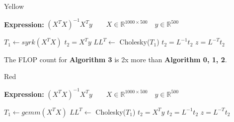 \documentclass[conference]{IEEEtran}
\begin{document}
\begin{algorithm}
	\renewcommand{\thealgorithm}{}
	\caption{ Yellow }
	\label{alg:a0}
	\textbf{Expression: } $(X^TX)^{-1}X^{T}y \qquad X \in \mathbb{R}^{1000 \times 500} \quad y \in \mathbb{R}^{500}$ 
	\begin{algorithmic}[1] 
		\State $T_1 \leftarrow syrk(X^{T}X)$ 
		\State $t_2 = X^{T}y$ 
		\State $LL^{T} \leftarrow $ Cholesky($T_1$) 
		\State $t_2 = L^{-1}t_2$ 
		\State $z = L^{-T}t_2$
	\end{algorithmic}
\end{algorithm}

The FLOP count for \textbf{Algorithm 3} is 2x more than  \textbf{Algorithm 0, 1, 2}.
\begin{algorithm}[H]
	\renewcommand{\thealgorithm}{}
	\caption{ Red }
	\label{alg:a0}
	\textbf{Expression: } $(X^TX)^{-1}X^{T}y \qquad X \in \mathbb{R}^{1000 \times 500} \quad y \in \mathbb{R}^{500}$ 
	\begin{algorithmic}[1] 
		\State $T_1 \leftarrow gemm(X^{T}X)$ 
		\State $LL^{T} \leftarrow $ Cholesky($T_1$) 
		\State $t_2 = X^{T}y$ 
		\State $t_2 = L^{-1}t_2$ 
		\State $z = L^{-T}t_2$
	\end{algorithmic}

\end{algorithm}
\end{document}
